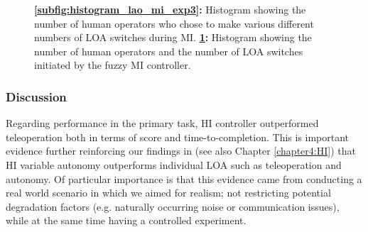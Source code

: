 \documentclass[a4paper,12pt,oneside,openright]{bhamthesis}
\begin{document}
\begin{figure}
\begin{subfigure}[b]{0.45\textwidth}
			\caption{}
			\label{subfig:histogram_lao_mi_ai_exp3}
		\end{subfigure}
		\hfill
		\caption{\textbf{\ref{subfig:histogram_lao_mi_exp3}:} Histogram showing the number of human operators who chose to make various different numbers of LOA switches during MI. \textbf{\ref{subfig:histogram_lao_mi_ai_exp3}:} Histogram showing the number of human operators and the number of LOA switches initiated by the fuzzy MI controller.}
		\label{fig:histograms_mi_exp3}
	\end{figure}


\subsubsection{Discussion}
Regarding performance in the primary task, HI controller outperformed teleoperation both in terms of score and time-to-completion. This is important evidence further reinforcing our findings in \citep{Chiou2016} (see also Chapter \ref{chapter4:HI}) that HI variable autonomy outperforms individual LOA such as teleoperation and autonomy. Of particular importance is that this evidence came from conducting a real world scenario in which we aimed for realism; not restricting potential degradation factors (e.g. naturally occurring noise or communication issues), while at the same time having a controlled experiment. 
\end{document}
